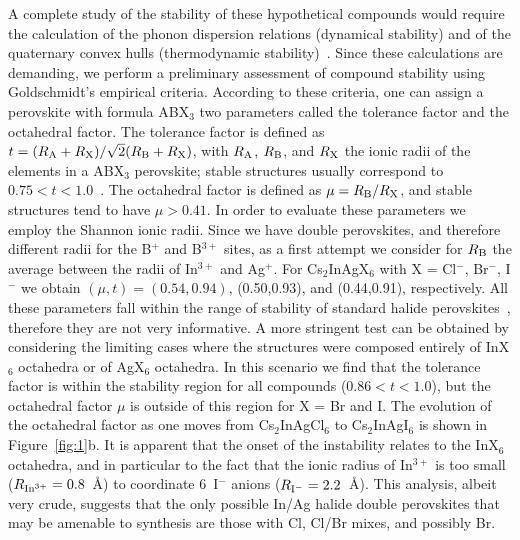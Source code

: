 \documentclass[journal=jpcl,manuscript=letter,layout=traditional]{achemso}
\begin{document}
A complete study of the stability of these hypothetical compounds would require the calculation
of the phonon dispersion relations (dynamical stability) and of the quaternary convex hulls
(thermodynamic stability)~\cite{Hautier2012}. Since these
calculations are demanding, we perform a preliminary assessment of compound stability using
Goldschmidt's empirical criteria. According to these criteria, one can
assign a perovskite with formula ABX$_3$ two parameters called the tolerance factor and the octahedral
factor. The tolerance factor is defined as $t = (R_{\rm A}+R_{\rm X})/\sqrt{2}
(R_{\rm B}+R_{\rm X})$, with $R_{\rm A}$, $R_{\rm B}$, and $R_{\rm X}$ the ionic radii of the
elements in a ABX$_3$ perovskite; stable structures usually correspond to $0.75<t<1.0$~\cite{li}.
The octahedral factor is defined as $\mu = R_{\rm B}/R_{\rm X}$,
and stable structures tend to have $\mu > 0.41$.
In order to evaluate these parameters we employ the Shannon ionic radii.
Since we have double perovskites, and therefore different radii for the B$^{+}$  and B$^{3+}$
sites, as a first attempt we consider for $R_{\rm B}$ the average between the radii of In$^{3+}$ and Ag$^{+}$.
For Cs$_2$InAgX$_6$ with X = Cl$^{-}$, Br$^{-}$, I$^{-}$ we obtain $(\mu,t) = (0.54,0.94)$, (0.50,0.93), and
(0.44,0.91), respectively. All these parameters fall within the range of stability of
standard halide perovskites~\cite{li}, therefore they are not very informative. A more stringent
test can be obtained by considering the limiting cases where the structures were composed
entirely of InX$_6$ octahedra or of AgX$_6$ octahedra. In this scenario we find that
the tolerance factor is within the stability region for all compounds ($0.86<t<1.0$), but the octahedral
factor $\mu$ is outside of this region for X = Br and I. The evolution of the octahedral
factor as one moves from Cs$_2$InAgCl$_6$ to Cs$_2$InAgI$_6$ is shown in Figure~\ref{fig:1}b.
It is apparent that the onset of the instability relates to the InX$_6$ octahedra, and in
particular to the fact that the ionic radius of In$^{3+}$ is too small ($R_{{\rm In}^{3+}}=0.8$~\AA)
to coordinate 6~I$^{-}$ anions ($R_{{\rm I}^{-}}=2.2$~\AA).
This analysis, albeit very crude, suggests that the only possible In/Ag halide double
perovskites that may be amenable to synthesis are those with Cl, Cl/Br mixes, and possibly Br.
\end{document}
